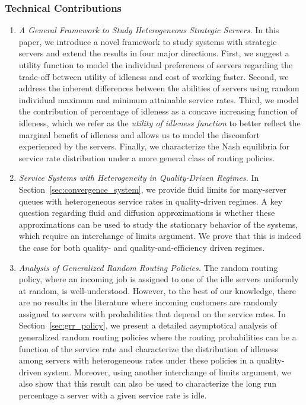 \documentclass[a4paper,11pt,twoside]{article}
\numberwithin{equation}{section}
\numberwithin{figure}{section}
\theoremstyle{plain}
\newcommand{\1}{\mathbbm{1}}
\begin{document}
\subsubsection*{Technical Contributions}
\begin{enumerate}
\item \emph{A General Framework to Study Heterogeneous Strategic Servers.} In this paper, we introduce a novel framework to study systems with strategic servers and extend the results in four major directions. First, we suggest a utility function to model the individual preferences of servers regarding the trade-off between utility of idleness and cost of working faster. Second, we address the inherent differences between the abilities of servers using random individual maximum and minimum attainable service rates. Third, we model the contribution of percentage of idleness as a concave increasing function of idleness, which we refer as the \emph{utility of idleness function} to better reflect the marginal benefit of idleness and allows us to model the discomfort experienced by the servers. Finally, we characterize the Nash equilibria for service rate distribution under a more general class of routing policies.

\item \emph{Service Systems with Heterogeneity in Quality-Driven Regimes.} In Section~\ref{sec:convergence_system}, we provide fluid limits for many-server queues with heterogeneous service rates in quality-driven regimes. A key question regarding fluid and diffusion approximations is whether these approximations can be used to study the stationary behavior of the systems, which require an interchange of limits argument. We prove that this is indeed the case for both quality- and quality-and-efficiency driven regimes. 

\item \emph{Analysis of Generalized Random Routing Policies.} The random routing policy, where an incoming job is assigned to one of the idle servers uniformly at random, is well-understood. However, to the best of our knowledge, there are no results in the literature where incoming customers are randomly assigned to servers with probabilities that depend on the service rates.  
In Section~\ref{sec:grr_policy}, we present a detailed asymptotical analysis of generalized random routing policies where the routing probabilities can be a function of the service rate and characterize the distribution of idleness among servers with heterogeneous rates under these policies in a quality-driven system. %
Moreover, using another interchange of limits argument, we also show that this result can also be used to characterize the long run percentage a server with a given service rate is idle. 
\end{enumerate}
\end{document}
